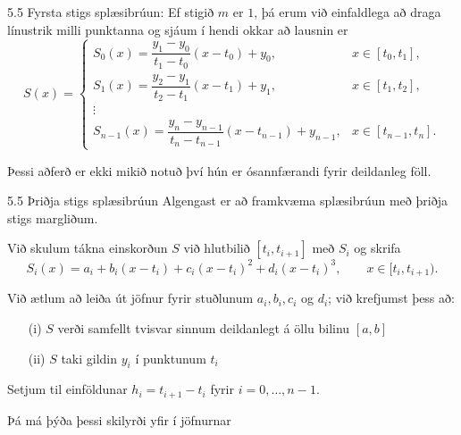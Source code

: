 \begin{frame}{5.5 Fyrsta stigs splæsibrúun:} 
Ef stigið $m$ er $1$, þá erum við einfaldlega að draga línustrik milli punktanna og sjáum í hendi okkar að lausnin er
\begin{equation*}
	S(x) = \begin{cases}
		S_0(x) = \dfrac {y_1-y_0}{t_1-t_0}(x-t_0)+y_0, 
			& x \in [t_0,t_1],\\
		S_1(x) = \dfrac {y_2-y_1}{t_2-t_1}(x-t_1)+y_1, 
			& x \in [t_1,t_2],\\
		\vdots & \\
		S_{n-1}(x) = \dfrac {y_n-y_{n-1}}{t_n-t_{n-1}}
			(x-t_{n-1})+y_{n-1}, &x \in [t_{n-1},t_n].
	\end{cases}
\end{equation*}

\pause
\smallskip
Þessi aðferð er ekki mikið notuð því hún er ósannfærandi fyrir
deildanleg föll.
\end{frame}

\begin{frame}{5.5 Þriðja stigs splæsibrúun} 
Algengast er að framkvæma splæsibrúun með þriðja stigs margliðum. 

\pause
\smallskip
Við skulum tákna einskorðun $S$ við hlutbilið $[t_i,t_{i+1}]$ með $S_i$ og
skrifa 
\begin{equation*}
	S_i(x) = a_i+b_i(x-t_i)+c_i(x-t_i)^2+d_i(x-t_i)^3, 
		\qquad x\in [t_i,t_{i+1}).
\end{equation*}

\pause
\smallskip
Við ætlum að leiða út jöfnur fyrir stuðlunum $a_i, b_i, c_i$ og $d_i$;
við krefjumst þess að: 

\begin{enumerate}
\item[(i)] $S$ verði samfellt tvisvar sinnum deildanlegt á
öllu bilinu $[a,b]$
\item[(ii)] $S$ taki gildin $y_i$ í punktunum $t_i$ 
\end{enumerate}

\pause
\smallskip
Setjum til einföldunar $h_i = t_{i+1}-t_i$ fyrir $i = 0,
\ldots, n-1$.

\pause
\smallskip
 Þá má þýða þessi skilyrði yfir í jöfnurnar 
\end{frame}

